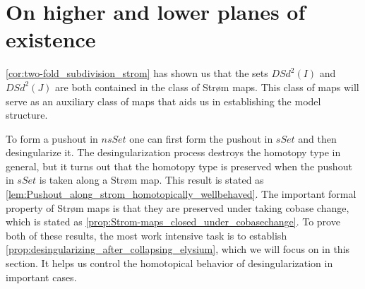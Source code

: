 

\section{On higher and lower planes of existence}
\label{sec:planes}

\noindent \cref{cor:two-fold_subdivision_strom} has shown us that the sets $DSd^2(I)$ and $DSd^2(J)$ are both contained in the class of Str\o m maps. This class of maps will serve as an auxiliary class of maps that aids us in establishing the model structure.

To form a pushout in $nsSet$ one can first form the pushout in $sSet$ and then desingularize it. The desingularization process destroys the homotopy type in general, but it turns out that the homotopy type is preserved when the pushout in $sSet$ is taken along a Str\o m map. This result is stated as \cref{lem:Pushout_along_strom_homotopically_wellbehaved}. The important formal property of Str\o m maps is that they are preserved under taking cobase change, which is stated as \cref{prop:Strom-maps_closed_under_cobasechange}. To prove both of these results, the most work intensive task is to establish \cref{prop:desingularizing_after_collapsing_elysium}, which we will focus on in this section. It helps us control the homotopical behavior of desingularization in important cases.

